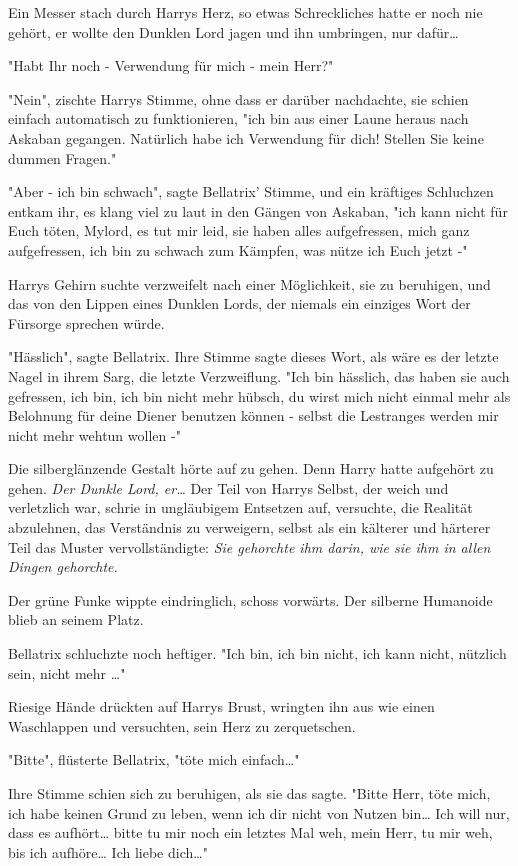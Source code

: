 {Ein Messer stach durch Harrys Herz, so etwas Schreckliches hatte er noch nie gehört, er wollte den Dunklen Lord jagen und ihn umbringen, nur dafür…

"Habt Ihr noch - Verwendung für mich - mein Herr?"

"Nein", zischte Harrys Stimme, ohne dass er darüber nachdachte, sie schien einfach automatisch zu funktionieren, "ich bin aus einer Laune heraus nach Askaban gegangen. Natürlich habe ich Verwendung für dich! Stellen Sie keine dummen Fragen."

"Aber - ich bin schwach", sagte Bellatrix' Stimme, und ein kräftiges Schluchzen entkam ihr, es klang viel zu laut in den Gängen von Askaban, "ich kann nicht für Euch töten, Mylord, es tut mir leid, sie haben alles aufgefressen, mich ganz aufgefressen, ich bin zu schwach zum Kämpfen, was nütze ich Euch jetzt -"

Harrys Gehirn suchte verzweifelt nach einer Möglichkeit, sie zu beruhigen, und das von den Lippen eines Dunklen Lords, der niemals ein einziges Wort der Fürsorge sprechen würde.

"Hässlich", sagte Bellatrix. Ihre Stimme sagte dieses Wort, als wäre es der letzte Nagel in ihrem Sarg, die letzte Verzweiflung. "Ich bin hässlich, das haben sie auch gefressen, ich bin, ich bin nicht mehr hübsch, du wirst mich nicht einmal mehr als Belohnung für deine Diener benutzen können - selbst die Lestranges werden mir nicht mehr wehtun wollen -"

Die silberglänzende Gestalt hörte auf zu gehen. Denn Harry hatte aufgehört zu gehen. \emph{Der Dunkle Lord, er…} Der Teil von Harrys Selbst, der weich und verletzlich war, schrie in ungläubigem Entsetzen auf, versuchte, die Realität abzulehnen, das Verständnis zu verweigern, selbst als ein kälterer und härterer Teil das Muster vervollständigte: \emph{Sie gehorchte ihm darin, wie sie ihm in allen Dingen gehorchte.}

Der grüne Funke wippte eindringlich, schoss vorwärts. Der silberne Humanoide blieb an seinem Platz.

Bellatrix schluchzte noch heftiger. "Ich bin, ich bin nicht, ich kann nicht, nützlich sein, nicht mehr …"

Riesige Hände drückten auf Harrys Brust, wringten ihn aus wie einen Waschlappen und versuchten, sein Herz zu zerquetschen.

"Bitte", flüsterte Bellatrix, "töte mich einfach…"

Ihre Stimme schien sich zu beruhigen, als sie das sagte. "Bitte Herr, töte mich, ich habe keinen Grund zu leben, wenn ich dir nicht von Nutzen bin… Ich will nur, dass es aufhört… bitte tu mir noch ein letztes Mal weh, mein Herr, tu mir weh, bis ich aufhöre… Ich liebe dich…"

}
